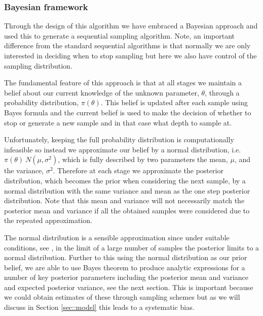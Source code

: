 \subsubsection{Bayesian framework}\label{sec::bayes}
Through the design of this algorithm we have embraced a Bayesian approach \cite{} and used this to generate a sequential sampling algorithm. Note, an important difference from the standard sequential algorithms is that normally we are only interested in deciding when to stop sampling but here we also have control of the sampling distribution.

The fundamental feature of this approach is that at all stages we maintain a belief about our current knowledge of the unknown parameter, $\theta$, through a probability distribution, $\pi(\theta)$. This belief is updated after each sample using Bayes formula \cite{} and the current belief is used to make the decision of whether to
stop or generate a new sample and in that case what depth to sample at.

Unfortunately, keeping the full probability distribution is computationally infeasible so instead we approximate our belief by a normal distribution, i.e. $\pi(\theta)~N(\mu,\sigma^2)$, which is fully described by two parameters the mean, $\mu$, and the variance, $\sigma^2$. Therefore at each stage we approximate the posterior distribution, which becomes the prior when considering the next sample, by a normal distribution with the same variance and mean as the one step posterior distribution. Note that this mean and variance will not necessarily match the posterior mean and variance if all the obtained samples were considered due to the repeated approximation.

The normal distribution is a sensible approximation since under suitable conditions, see \cite{}, in the limit of a large number of samples the posterior limits to a normal distribution. Further to this using the normal distribution as our prior belief, we are able to use Bayes theorem to produce analytic expressions for a number of key posterior parameters including the posterior mean and variance and expected posterior variance, see the next section. This is important because we could obtain estimates of these through sampling schemes \cite{} but as we will discuss in Section \ref{sec::model} this leads to a systematic bias.

